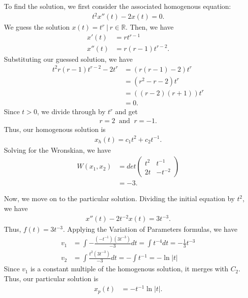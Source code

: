 \documentclass[12pt]{article}
\begin{document}
To find the solution, we first consider the associated homogenous equation:
\begin{align*}
    t^2x''(t) - 2x(t) = 0.
\end{align*}
We guess the solution $x(t) = t^r ~|~ r\in{\mathbb{R}}$. Then, we have
\begin{align*}
    x'(t)  & = rt^{r-1}       \\
    x''(t) & = r(r-1)t^{r-2}.
\end{align*}
Substituting our guessed solution, we have
\begin{align*}
    t^2r(r-1)t^{r-2} - 2t^r & = (r(r-1)-2)t^{r}    \\
                            & = (r^2 - r -2 )t^{r} \\
                            & = ((r-2)(r+1))t^{r}  \\
                            & = 0.
\end{align*}
Since $t>0$, we divide through by $t^r$ and get
\begin{align*}
    r = 2 ~\text{ and } ~r = -1.
\end{align*}
Thus, our homogenous solution is
\begin{align*}
    x_h(t) = c_1t^2 + c_2t^{-1}.
\end{align*}
Solving for the Wronskian, we have
\begin{align*}
    W(x_1, x_2) & = det \begin{pmatrix}
                            t^2 & t^{-1} \\ 2t & -t^{-2}
                        \end{pmatrix} \\
                & = -3.
\end{align*}

Now, we move on to the particular solution.
Dividing the initial equation by $t^2$, we have
\begin{align*}
    x''(t) - 2t^{-2}x(t) = 3t^{-3}.
\end{align*}
Thus, $f(t) = 3t^{-3}$.
Applying the Variation of Parameters formulas, we have
\begin{align*}
    v_1 & = \int -\frac{(-t^{-1})(3t^{-3})}{-3} dt = \int t^{-4}dt = -\frac{1}{3}t^{-3} \\
    v_2 & = \int \frac{t^2(3t^{-3})}{-3} dt = -\int t^{-1} =   -\ln|t|
\end{align*}
Since $v_1$ is a constant multiple of the homogenous solution, it merges with $C_2$.
Thus, our particular solution is
\begin{align*}
    x_p(t) & = -t^{-1}\ln|t|.
\end{align*}
\end{document}
